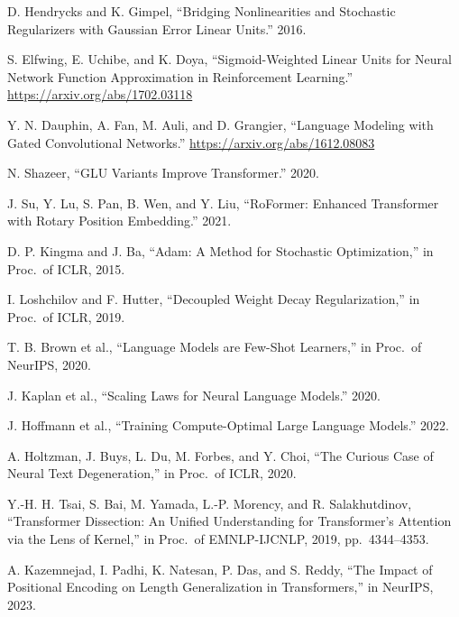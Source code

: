 \begin{enumerate}[label={[\arabic*]}, leftmargin=*, itemsep=1.5pt]
  \item D. Hendrycks and K. Gimpel, ``Bridging Nonlinearities and Stochastic Regularizers with Gaussian Error Linear Units.'' 2016.
  \item S. Elfwing, E. Uchibe, and K. Doya, ``Sigmoid-Weighted Linear Units for Neural Network Function Approximation in Reinforcement Learning.'' \url{https://arxiv.org/abs/1702.03118}
  \item Y. N. Dauphin, A. Fan, M. Auli, and D. Grangier, ``Language Modeling with Gated Convolutional Networks.'' \url{https://arxiv.org/abs/1612.08083}
  \item N. Shazeer, ``GLU Variants Improve Transformer.'' 2020.
  \item J. Su, Y. Lu, S. Pan, B. Wen, and Y. Liu, ``RoFormer: Enhanced Transformer with Rotary Position Embedding.'' 2021.
  \item D. P. Kingma and J. Ba, ``Adam: A Method for Stochastic Optimization,'' in Proc.\ of ICLR, 2015.
  \item I. Loshchilov and F. Hutter, ``Decoupled Weight Decay Regularization,'' in Proc.\ of ICLR, 2019.
  \item T. B. Brown et al., ``Language Models are Few-Shot Learners,'' in Proc.\ of NeurIPS, 2020.
  \item J. Kaplan et al., ``Scaling Laws for Neural Language Models.'' 2020.
  \item J. Hoffmann et al., ``Training Compute-Optimal Large Language Models.'' 2022.
  \item A. Holtzman, J. Buys, L. Du, M. Forbes, and Y. Choi, ``The Curious Case of Neural Text Degeneration,'' in Proc.\ of ICLR, 2020.
  \item Y.-H. H. Tsai, S. Bai, M. Yamada, L.-P. Morency, and R. Salakhutdinov, ``Transformer Dissection: An Unified Understanding for Transformer's Attention via the Lens of Kernel,'' in Proc.\ of EMNLP-IJCNLP, 2019, pp.\ 4344--4353.
  \item A. Kazemnejad, I. Padhi, K. Natesan, P. Das, and S. Reddy, ``The Impact of Positional Encoding on Length Generalization in Transformers,'' in NeurIPS, 2023.
\end{enumerate}
\endgroup
